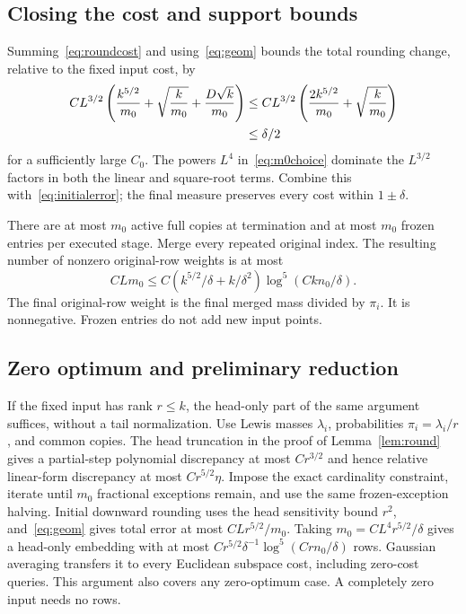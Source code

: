 \documentclass[11pt]{article}
\theoremstyle{remark}\newtheorem{remark}[theorem]{Remark}
\numberwithin{equation}{section}
\begin{document}
\subsection{Closing the cost and support bounds}
Summing~\eqref{eq:roundcost} and using~\eqref{eq:geom} bounds the total rounding change, relative to the fixed input cost, by
\begin{align}\label{eq:totalcosterror}
 CL^{3/2}\left(\frac{k^{5/2}}{m_0}+\sqrt{\frac{k}{m_0}}
 +\frac{D\sqrt k}{m_0}\right)
 &\le CL^{3/2}\left(\frac{2k^{5/2}}{m_0}+\sqrt{\frac{k}{m_0}}\right)\notag\\
 &\le\delta/2
\end{align}
for a sufficiently large $C_0$. The powers $L^4$ in~\eqref{eq:m0choice} dominate the $L^{3/2}$ factors in both the linear and square-root terms. Combine this with~\eqref{eq:initialerror}; the final measure preserves every cost within $1\pm\delta$.

There are at most $m_0$ active full copies at termination and at most $m_0$ frozen entries per executed stage. Merge every repeated original index. The resulting number of nonzero original-row weights is at most
\begin{equation}\label{eq:finiteupper}
 C Lm_0\le C\left(k^{5/2}/\delta+k/\delta^2\right)
 \log^5(Ckn_0/\delta).
\end{equation}
The final original-row weight is the final merged mass divided by $\pi_i$. It is nonnegative. Frozen entries do not add new input points.

\subsection{Zero optimum and preliminary reduction}
If the fixed input has rank $r\le k$, the head-only part of the same argument suffices, without a tail normalization. Use Lewis masses $\lambda_i$, probabilities $\pi_i=\lambda_i/r$, and common copies. The head truncation in the proof of Lemma~\ref{lem:round} gives a partial-step polynomial discrepancy at most $Cr^{3/2}$ and hence relative linear-form discrepancy at most $Cr^{5/2}\eta$. Impose the exact cardinality constraint, iterate until $m_0$ fractional exceptions remain, and use the same frozen-exception halving. Initial downward rounding uses the head sensitivity bound $r^2$, and~\eqref{eq:geom} gives total error at most $CLr^{5/2}/m_0$. Taking $m_0=CL^4 r^{5/2}/\delta$ gives a head-only embedding with at most $Cr^{5/2}\delta^{-1}\log^5(Crn_0/\delta)$ rows. Gaussian averaging transfers it to every Euclidean subspace cost, including zero-cost queries. This argument also covers any zero-optimum case. A completely zero input needs no rows.
\end{document}
